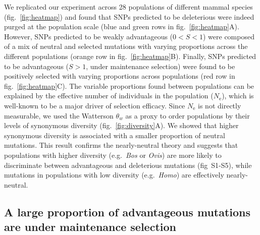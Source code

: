 \documentclass{article}
\newcommand{\Ne}{N_{\textrm{e}}}
\newcommand{\Sphy}{S}
\newcommand{\divWeakAdv}{0 < \Sphy < 1}
\newcommand{\divAdv}{ \Sphy > 1}
\begin{document}
    We replicated our experiment across 28 populations of different mammal species (fig.~\ref{fig:heatmap}) and found that SNPs predicted to be deleterious were indeed purged at the population scale (blue and green rows in fig.~\ref{fig:heatmap}A).
    However, SNPs predicted to be weakly advantageous ($\divWeakAdv$) were composed of a mix of neutral and selected mutations with varying proportions across the different populations (orange row in fig.~\ref{fig:heatmap}B).
    Finally, SNPs predicted to be advantageous ($\divAdv$, under maintenance selection) were found to be positively selected with varying proportions across populations (red row in fig.~\ref{fig:heatmap}C).
    The variable proportions found between populations can be explained by the effective number of individuals in the population ($\Ne$), which is well-known to be a major driver of selection efficacy.
    Since $\Ne$ is not directly measurable, we used the Watterson $\theta_w$ as a proxy to order populations by their levels of synonymous diversity (fig.~\ref{fig:diversity}A).
    We showed that higher synonymous diversity is associated with a smaller proportion of neutral mutations.
    This result confirms the nearly-neutral theory and suggests that populations with higher diversity (e.g.~\textit{Bos} or \textit{Ovis}) are more likely to discriminate between advantageous and deleterious mutations (fig~S1-S5), while mutations in populations with low diversity (e.g.~\textit{Homo}) are effectively nearly-neutral.

    \subsection*{A large proportion of advantageous mutations are under maintenance selection}
\end{document}
